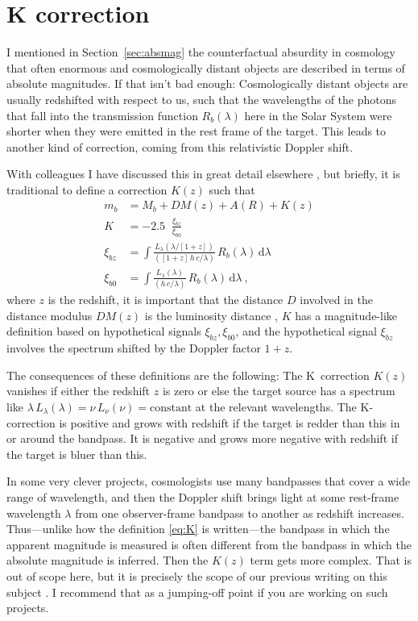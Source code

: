 \documentclass[10pt]{article}
\newcommand{\sectionname}{Section}
\newcommand{\secref}[1]{\sectionname~\ref{#1}}
\newcommand{\dd}{\mathrm{d}}
\DeclareMathOperator{\logten}{log_{10}}
\begin{document}
\section{K correction}\label{sec:kcorrect}

I mentioned in \secref{sec:absmag} the counterfactual absurdity in cosmology that often enormous and cosmologically distant objects are described in terms of absolute magnitudes.
If that isn't bad enough:
Cosmologically distant objects are usually redshifted with respect to us, such that the wavelengths of the photons that fall into the transmission function $R_b(\lambda)$ here in the Solar System were shorter when they were emitted in the rest frame of the target.
This leads to another kind of correction, coming from this relativistic Doppler shift.

With colleagues I have discussed this in great detail elsewhere \cite{kcorrect}, but briefly, it is traditional to define a correction $K(z)$ such that
\begin{align}
    m_b &= M_b + DM(z) + A(R) + K(z)\label{eq:K}\\
    K &= -2.5\logten\frac{\xi_{bz}}{\xi_{b0}}\\
    \xi_{bz} &= \int\frac{L_\lambda(\lambda/[1+z])}{([1+z]\,h\,c/\lambda)}\,R_b(\lambda)\,\dd\lambda\\
    \xi_{b0} &= \int\frac{L_\lambda(\lambda)}{(h\,c/\lambda)}\,R_b(\lambda)\,\dd\lambda ~,
\end{align}
where $z$ is the redshift,
it is important that the distance $D$ involved in the distance modulus $DM(z)$ is the luminosity distance \cite{distances},
$K$ has a magnitude-like definition based on hypothetical signals $\xi_{bz}, \xi_{b0}$,
and the hypothetical signal $\xi_{bz}$ involves the spectrum shifted by the Doppler factor $1+z$.

The consequences of these definitions are the following:
The K~correction $K(z)$ vanishes if either the redshift $z$ is zero or else the target source has a spectrum like $\lambda\,L_\lambda(\lambda)=\nu\,L_\nu(\nu)=\text{constant}$ at the relevant wavelengths.
The K-correction is positive and grows with redshift if the target is redder than this in or around the bandpass.
It is negative and grows more negative with redshift if the target is bluer than this.

In some very clever projects, cosmologists use many bandpasses that cover a wide range of wavelength, and then the Doppler shift brings light at some rest-frame wavelength $\lambda$ from one observer-frame bandpass to another as redshift increases.
Thus---unlike how the definition \eqref{eq:K} is written---the bandpass in which the apparent magnitude is measured is often different from the bandpass in which the absolute magnitude is inferred. Then the $K(z)$ term gets more complex.
That is out of scope here, but it is precisely the scope of our previous writing on this subject \cite{kcorrect}.
I recommend that as a jumping-off point if you are working on such projects.
\end{document}
